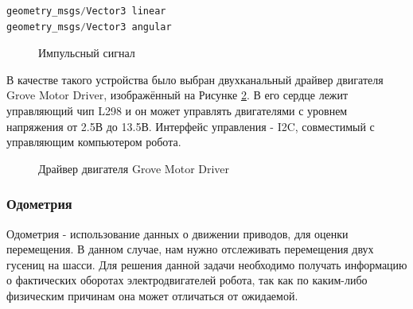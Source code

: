 \documentclass[12pt,a4paper]{scrartcl}
\begin{document}
					\begin{lstlisting}[language=C,caption={Формат сообщения geometry\_msgs/Twist},label={lst:TwistMsg}]
geometry_msgs/Vector3 linear
geometry_msgs/Vector3 angular
					\end{lstlisting}	
					
					\begin{figure}[h]
						\caption{Импульсный сигнал}
						\label{fig:Shim}
					\end{figure}
					
					В качестве такого устройства было выбран двухканальный драйвер двигателя Grove Motor Driver, изображённый на Рисунке \ref{fig:GroveMotorDriver}. В его сердце лежит управляющий чип L298 и он может управлять двигателями с уровнем напряжения от 2.5В до 13.5В\cite{bib:GroveMotorDriverDesc}. Интерфейс управления - I2C, совместимый с управляющим компьютером робота.
					
					\begin{figure}[h]
						\caption{Драйвер двигателя Grove Motor Driver}
						\label{fig:GroveMotorDriver}
					\end{figure}
					
				\subsubsection{Одометрия}
					Одометрия - использование данных о движении приводов, для оценки перемещения. В данном случае, нам нужно отслеживать перемещения двух гусениц на шасси. Для решения данной задачи необходимо получать информацию о фактических оборотах электродвигателей робота, так как по каким-либо физическим причинам она может отличаться от ожидаемой. 
					
\end{document}

